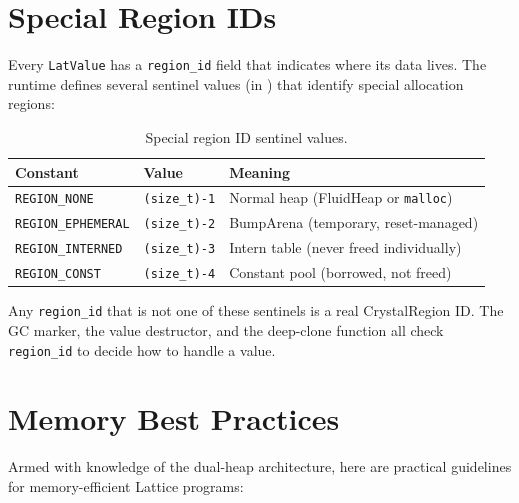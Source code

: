 
\section{Special Region IDs}\label{sec:special-region-ids}


Every \lstinline|LatValue| has a \lstinline|region_id| field that indicates where its data lives.
The runtime defines several sentinel values (in ) that identify special allocation regions:

\begin{table}[h]
\centering
\begin{tabular}{lll}
\toprule
\textbf{Constant} & \textbf{Value} & \textbf{Meaning} \\
\midrule
\lstinline|REGION_NONE| & \lstinline|(size_t)-1| & Normal heap (FluidHeap or \lstinline|malloc|) \\
\lstinline|REGION_EPHEMERAL| & \lstinline|(size_t)-2| & BumpArena (temporary, reset-managed) \\
\lstinline|REGION_INTERNED| & \lstinline|(size_t)-3| & Intern table (never freed individually) \\
\lstinline|REGION_CONST| & \lstinline|(size_t)-4| & Constant pool (borrowed, not freed) \\
\bottomrule
\end{tabular}
\caption{Special region ID sentinel values.}\label{tab:region-ids}
\end{table}

Any \lstinline|region_id| that is not one of these sentinels is a real CrystalRegion ID.
The GC marker, the value destructor, and the deep-clone function all check \lstinline|region_id| to decide how to handle a value.

\section{Memory Best Practices}\label{sec:memory-best-practices}

Armed with knowledge of the dual-heap architecture, here are practical guidelines for memory-efficient Lattice programs:

